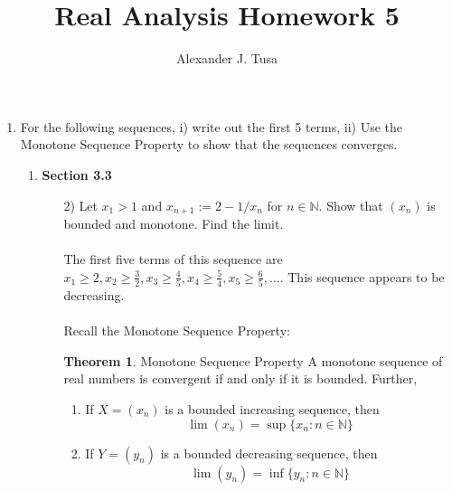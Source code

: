 \documentclass[12pt,letterpaper]{article}
\author{Alexander J. Tusa}
\title{Real Analysis Homework 5}
\newcommand{\N}{\mathbb{N}}
\theoremstyle{case}
\theoremstyle{definition}
\newtheorem*{theorem*}{Theorem}
\begin{document}
	\maketitle
	\begin{enumerate}
	\item For the following sequences, i) write out the first 5 terms, ii) Use the Monotone Sequence Property to show that the sequences converges.
	\begin{enumerate}
		\item \textbf{Section 3.3}
		\begin{enumerate}
			\item[2)] Let $x_1 > 1$ and $x_{n+1} := 2-1/x_n$ for $n \in \N$. Show that $(x_n)$ is bounded and monotone. Find the limit.
			\\\\ The first five terms of this sequence are $x_1 \geq 2,x_2 \geq \frac{3}{2}, x_3 \geq \frac{4}{5}, x_4 \geq \frac{5}{4}, x_5 \geq \frac{6}{5}, \dots$. This sequence appears to be decreasing.
			\\\\Recall the Monotone Sequence Property:
			\begin{theorem*}{Monotone Sequence Property}
				A monotone sequence of real numbers is convergent if and only if it is bounded. Further,
				\begin{enumerate}
					\item If $X=(x_n)$ is a bounded increasing sequence, then
					\[\lim (x_n) = \sup \{x_n:n \in \N\}\]
					
					\item If $Y=(y_n)$ is a bounded decreasing sequence, then
					\[\lim (y_n) = \inf \{y_n : n \in \N \}\]
				\end{enumerate}
			\end{theorem*}
		

\end{enumerate}
\end{enumerate}
\end{enumerate}
\end{document}
